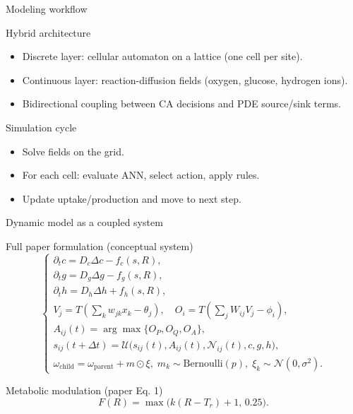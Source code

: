 \documentclass[10pt,aspectratio=169]{beamer}
\begin{document}
\begin{frame}[c]{Modeling workflow}
\begin{block}{Hybrid architecture}
\begin{itemize}
  \item Discrete layer: cellular automaton on a lattice (one cell per site).
  \item Continuous layer: reaction-diffusion fields (oxygen, glucose, hydrogen ions).
  \item Bidirectional coupling between CA decisions and PDE source/sink terms.
\end{itemize}
\end{block}
\begin{block}{Simulation cycle}
\begin{itemize}
  \item Solve fields on the grid.
  \item For each cell: evaluate ANN, select action, apply rules.
  \item Update uptake/production and move to next step.
\end{itemize}
\end{block}
\end{frame}

\begin{frame}[c]{Dynamic model as a coupled system}
\small
\begin{block}{Full paper formulation (conceptual system)}
\[
\begin{cases}
\partial_t c = D_c\Delta c - f_c(s,R),\\
\partial_t g = D_g\Delta g - f_g(s,R),\\
\partial_t h = D_h\Delta h + f_h(s,R),\\
V_j = T\!\left(\sum_k w_{jk}x_k-\theta_j\right),\quad
O_i = T\!\left(\sum_j W_{ij}V_j-\phi_i\right),\\
A_{ij}(t)=\arg\max\{O_P,O_Q,O_A\},\\
s_{ij}(t+\Delta t)=\mathcal{U}\big(s_{ij}(t),A_{ij}(t),\mathcal{N}_{ij}(t),c,g,h\big),\\
\omega_{\text{child}}=\omega_{\text{parent}}+m\odot\xi,
\;m_k\sim\mathrm{Bernoulli}(p),\;\xi_k\sim\mathcal N(0,\sigma^2).
\end{cases}
\]
\end{block}
\begin{alertblock}{Metabolic modulation (paper Eq. 1)}
\[
F(R)=\max\big(k(R-T_r)+1,\,0.25\big).
\]
\end{alertblock}
\end{frame}
\end{document}
